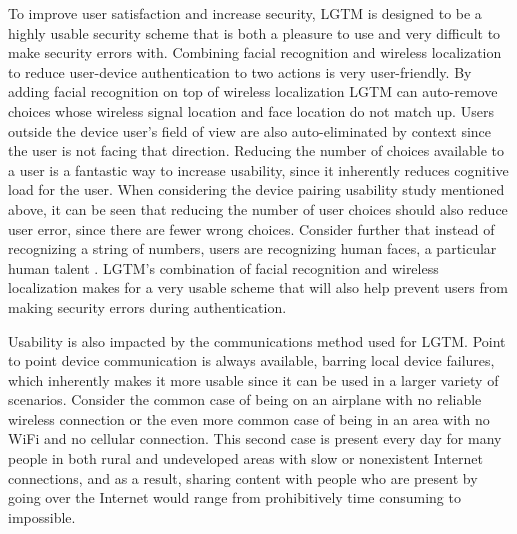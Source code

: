 \documentclass[12pt]{report}
\begin{document}
To improve user satisfaction and increase security, LGTM is designed to be a highly usable security scheme that is both a pleasure to use and very difficult to make security errors with. Combining facial recognition and wireless localization to reduce user-device authentication to two actions is very user-friendly. By adding facial recognition on top of wireless localization LGTM can auto-remove choices whose wireless signal location and face location do not match up. Users outside the device user's field of view are also auto-eliminated by context since the user is not facing that direction. Reducing the number of choices available to a user is a fantastic way to increase usability, since it inherently reduces cognitive load for the user. When considering the device pairing usability study mentioned above, it can be seen that reducing the number of user choices should also reduce user error, since there are fewer wrong choices. Consider further that instead of recognizing a string of numbers, users are recognizing human faces, a particular human talent \cite{NewbornsFaceRecognitionTurati2006}. LGTM's combination of facial recognition and wireless localization makes for a very usable scheme that will also help prevent users from making security errors during authentication. \par

Usability is also impacted by the communications method used for LGTM. Point to point device communication is always available, barring local device failures, which inherently makes it more usable since it can be used in a larger variety of scenarios. Consider the common case of being on an airplane with no reliable wireless connection or the even more common case of being in an area with no WiFi and no cellular connection. This second case is present every day for many people in both rural and undeveloped areas with slow or nonexistent Internet connections, and as a result, sharing content with people who are present by going over the Internet would range from prohibitively time consuming to impossible. \par

\end{document}
